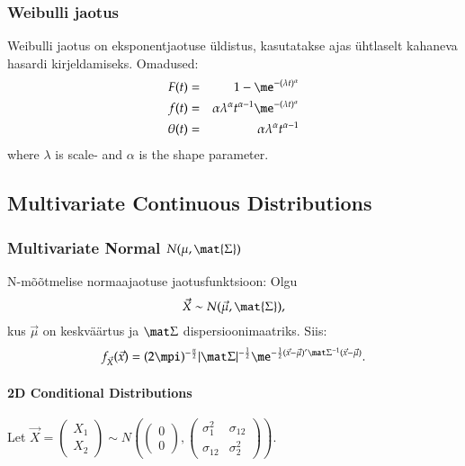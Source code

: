 \documentclass[a4paper]{article}
\numberwithin{equation}{subsection}
\begin{document}
\subsubsection{Weibulli jaotus}
Weibulli jaotus on eksponentjaotuse üldistus, kasutatakse ajas
ühtlaselt kahaneva hasardi kirjeldamiseks.  Omadused:
\begin{eqnarray}
  F(t) &=& 1 - \me^{-(\lambda t)^\alpha}
  \\
  f(t) &=& \alpha \lambda^\alpha t^{\alpha - 1}
  \me^{-(\lambda t)^\alpha}\\
  \theta(t) &=& \alpha \lambda^\alpha t^{\alpha - 1}
\end{eqnarray}
where $\lambda$ is scale- and $\alpha$ is the shape parameter.


\clearpage
\subsection{Multivariate Continuous Distributions}

\subsubsection{Multivariate Normal $N(\mu, \mat{\Sigma})$}

N-mõõtmelise normaajaotuse jaotusfunktsioon: Olgu
\begin{equation}
  \vec{X} \sim N(\vec{\mu}, \mat{\Sigma}),
\end{equation}
kus $\vec\mu$ on keskväärtus ja $\mat\Sigma$ dispersioonimaatriks.
Siis:
\begin{equation}
f_{\vec{X}} (\vec x) = 
  (2\mpi)^{-\frac{n}{2}} 
  |\mat\Sigma|^{-\frac{1}{2}}
  \me^{-\frac{1}{2}(\vec x - \vec\mu)' \mat\Sigma^{-1} (\vec x -
    \vec\mu)}.
\label{eq:N-Dimensional_normal}
\end{equation}

\paragraph{2D Conditional Distributions}
Let
\begin{math}
  \vec{X}=
  \begin{pmatrix}
    X_1\\
    X_2
  \end{pmatrix}
  \sim
  N \left( 
    \begin{pmatrix}
      0\\0
    \end{pmatrix},
    \begin{pmatrix}
      \sigma_1^2 & \sigma_{12} \\ 
      \sigma_{12} & \sigma_2^2
    \end{pmatrix}
\right)
\end{math}.
\end{document}
